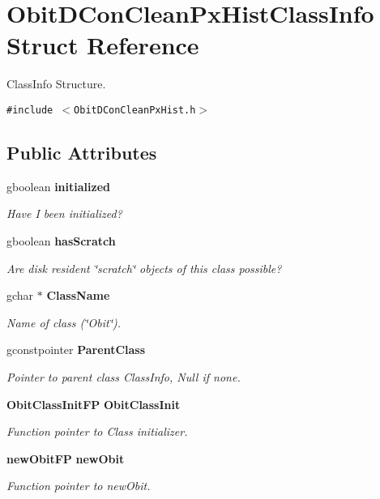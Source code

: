 \section{Obit\-DCon\-Clean\-Px\-Hist\-Class\-Info Struct Reference}
\label{structObitDConCleanPxHistClassInfo}
Class\-Info Structure.  


{\tt \#include $<$Obit\-DCon\-Clean\-Px\-Hist.h$>$}

\subsection*{Public Attributes}
\begin{CompactItemize}
\item 
gboolean {\bf initialized}
\begin{CompactList}\small\item\em Have I been initialized? \item\end{CompactList}\item 
gboolean {\bf has\-Scratch}
\begin{CompactList}\small\item\em Are disk resident \char`\"{}scratch\char`\"{} objects of this class possible? \item\end{CompactList}\item 
gchar $\ast$ {\bf Class\-Name}
\begin{CompactList}\small\item\em Name of class (\char`\"{}Obit\char`\"{}). \item\end{CompactList}\item 
gconstpointer {\bf Parent\-Class}
\begin{CompactList}\small\item\em Pointer to parent class Class\-Info, Null if none. \item\end{CompactList}\item 
{\bf Obit\-Class\-Init\-FP} {\bf Obit\-Class\-Init}
\begin{CompactList}\small\item\em Function pointer to Class initializer. \item\end{CompactList}\item 
{\bf new\-Obit\-FP} {\bf new\-Obit}
\begin{CompactList}\small\item\em Function pointer to new\-Obit. \item\end{CompactList}\item 

\end{CompactItemize}
